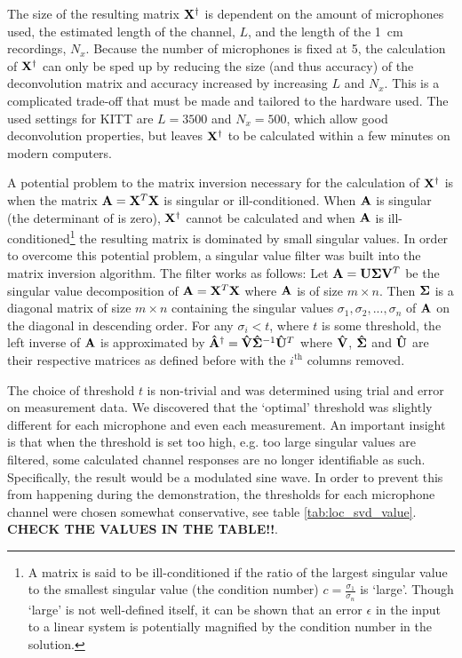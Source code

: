 \documentclass[11pt,titlepage]{report}
\begin{document}
The size of the resulting matrix $\mathbf{X}^\dagger$ is dependent on the amount of microphones used, the estimated length of the channel, $L$, and the length of the \SI{1}{cm} recordings, $N_x$. Because the number of microphones is fixed at \num{5}, the calculation of $\mathbf{X}^\dagger$ can only be sped up by reducing the size (and thus accuracy) of the deconvolution matrix and accuracy increased by increasing $L$ and $N_x$. This is a complicated trade-off that must be made and tailored to the hardware used. The used settings for KITT are $L=3500$ and $N_x=500$, which allow good deconvolution properties, but leaves $\mathbf{X}^\dagger$ to be calculated within a few minutes on modern computers.

A potential problem to the matrix inversion necessary for the calculation of $\mathbf{X}^\dagger$ is when the matrix $\mathbf{A}=\mathbf{X}^T\mathbf{X}$ is singular or ill-conditioned. When $\mathbf{A}$ is singular (the determinant of  is zero), $\mathbf{X}^\dagger$ cannot be calculated and when $\mathbf{A}$ is ill-conditioned\footnote{A matrix is said to be ill-conditioned if the ratio of the largest singular value to the smallest singular value (the condition number) $c=\frac{\sigma_1}{\sigma_n}$ is `large'. Though `large' is not well-defined itself, it can be shown \cite{epo4-manual} that an error $\epsilon$ in the input to a linear system is potentially magnified by the condition number in the solution.} the resulting matrix is dominated by small singular values. In order to overcome this potential problem, a singular value filter was built into the matrix inversion algorithm. The filter works as follows:
Let $\mathbf{A}=\mathbf{U}\mathbf{\Sigma}\mathbf{V}^T$ be the singular value decomposition of $\mathbf{A}=\mathbf{X}^T\mathbf{X}$ where $\mathbf{A}$ is of size $m\times n$. Then $\mathbf{\Sigma}$ is a diagonal matrix of size $m \times n$ containing the singular values $\sigma_1, \sigma_2, ..., \sigma_n$ of $\mathbf{A}$ on the diagonal in descending order. For any $\sigma_i<t$, where $t$ is some threshold, the left inverse of $\mathbf{A}$ is approximated by $\mathbf{\hat{A}}^\dagger=\mathbf{\hat{V}}\mathbf{\hat{\Sigma}}^{-1}\mathbf{\hat{U}}^T$ where $\mathbf{\hat{V}}$, $\mathbf{\hat{\Sigma}}$ and $\mathbf{\hat{U}}$ are their respective matrices as defined before with the $i^\text{th}$ columns removed. 

The choice of threshold $t$ is non-trivial and was determined using trial and error on measurement data. We discovered that the `optimal' threshold was slightly different for each microphone and even each measurement. An important insight is that when the threshold is set too high, e.g. too large singular values are filtered, some calculated channel responses are no longer identifiable as such. Specifically, the result would be a modulated sine wave. In order to prevent this from happening during the demonstration, the thresholds for each microphone channel were chosen somewhat conservative, see table \ref{tab:loc_svd_value}. \textbf{CHECK THE VALUES IN THE TABLE!!}.
\end{document}
